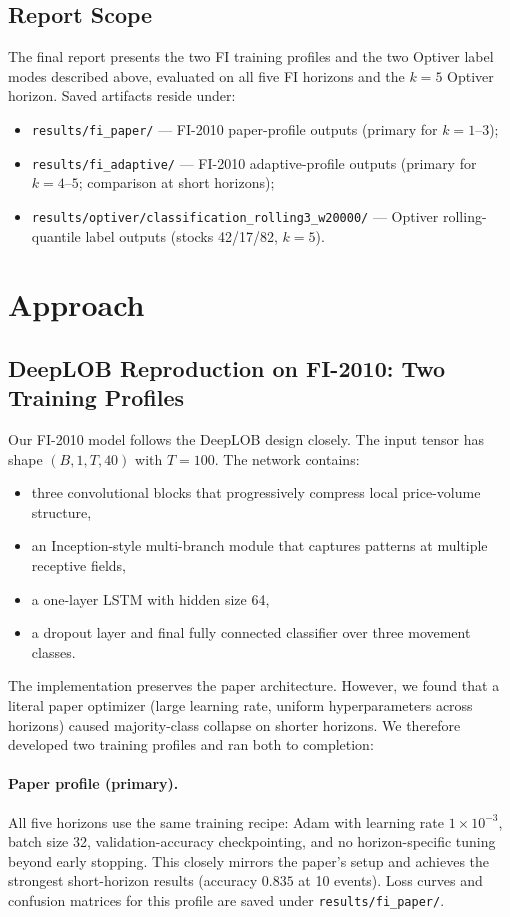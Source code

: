 \documentclass[11pt]{article}
\begin{document}
\subsection{Report Scope}
The final report presents the two FI training profiles and the two Optiver label modes described above, evaluated on all five FI horizons and the $k{=}5$ Optiver horizon. Saved artifacts reside under:
\begin{itemize}[leftmargin=*]
    \item \texttt{results/fi\_paper/} --- FI-2010 paper-profile outputs (primary for $k{=}1$--$3$);
    \item \texttt{results/fi\_adaptive/} --- FI-2010 adaptive-profile outputs (primary for $k{=}4$--$5$; comparison at short horizons);
    \item \texttt{results/optiver/classification\_rolling3\_w20000/} --- Optiver rolling-quantile label outputs (stocks 42/17/82, $k{=}5$).
\end{itemize}

\section{Approach}
\subsection{DeepLOB Reproduction on FI-2010: Two Training Profiles}
Our FI-2010 model follows the DeepLOB design closely. The input tensor has shape $(B,1,T,40)$ with $T=100$. The network contains:
\begin{itemize}[leftmargin=*]
    \item three convolutional blocks that progressively compress local price-volume structure,
    \item an Inception-style multi-branch module that captures patterns at multiple receptive fields,
    \item a one-layer LSTM with hidden size 64,
    \item a dropout layer and final fully connected classifier over three movement classes.
\end{itemize}

The implementation preserves the paper architecture. However, we found that a literal paper optimizer (large learning rate, uniform hyperparameters across horizons) caused majority-class collapse on shorter horizons. We therefore developed two training profiles and ran both to completion:

\paragraph{Paper profile (primary).} All five horizons use the same training recipe: Adam with learning rate $1\times10^{-3}$, batch size 32, validation-accuracy checkpointing, and no horizon-specific tuning beyond early stopping. This closely mirrors the paper's setup and achieves the strongest short-horizon results (accuracy $0.835$ at 10 events). Loss curves and confusion matrices for this profile are saved under \texttt{results/fi\_paper/}.
\end{document}
